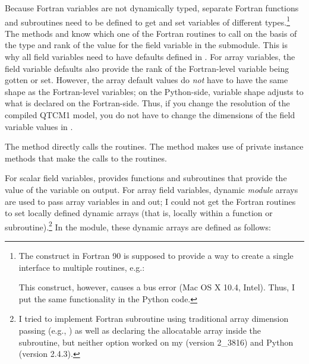 Because Fortran variables are not dynamically typed, separate Fortran
functions and subroutines need to be defined to get and set variables
of different types.\footnote%
	{The  construct in Fortran 90 is supposed to
	provide a way to create a single interface to multiple
	routines, e.g.:
	\begin{codeblock}
	\end{codeblock}
	This construct, however, causes a bus error
	(Mac OS X 10.4, Intel).  Thus, I put the
	same functionality in the Python code.}
The  methods 
and  know which one of the Fortran routines
to call on the basis of the type and rank of the value for the field
variable in the  submodule.  This is why all field
variables need to have defaults defined in .  For
array variables, the field variable defaults also provide the rank
of the Fortran-level variable being gotten or set.  However, the
array default values do \emph{not} have to have the same shape as
the Fortran-level variables; on the Python-side, variable shape
adjusts to what is declared on the Fortran-side.  
Thus, if you change the resolution of
the compiled QTCM1 model, you do not have to change the dimensions
of the field variable values in .

The  method  directly calls
the  routines.
The  method  makes use of
private instance methods that make the calls to the  routines.

For scalar field variables,  provides functions and
subroutines that provide the value of the variable on output.
For array field variables, 
dynamic \emph{module} arrays are used to pass array
variables in and out; I could not get the 
 Fortran routines to set
locally defined dynamic arrays (that is, locally within a function or
subroutine).\footnote%
	{I tried to implement Fortran subroutine
	 using traditional array 
	dimension passing 
	(e.g., ) as well
	as declaring the allocatable array inside the subroutine, 
	but neither option worked on my  (version 2\_3816) 
	and Python (version 2.4.3).}
In the  module, these dynamic arrays
are defined as follows:

